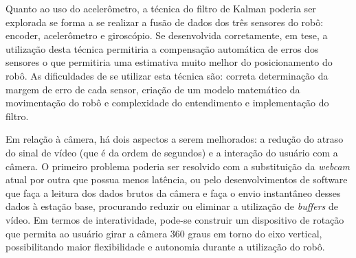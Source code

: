 Quanto ao uso do acelerômetro, a técnica do filtro de Kalman poderia ser explorada se forma a se realizar a fusão de dados dos três sensores do robô: encoder, acelerômetro e giroscópio. Se desenvolvida corretamente, em tese, a utilização desta técnica permitiria a compensação automática de erros dos sensores o que permitiria uma estimativa muito melhor do posicionamento do robô. As dificuldades de se utilizar esta técnica são: correta determinação da margem de erro de cada sensor, criação de um modelo matemático da movimentação do robô e complexidade do entendimento e implementação do filtro.

Em relação à câmera, há dois aspectos a serem melhorados: a redução do atraso do sinal de vídeo (que é da ordem de segundos) e a interação do usuário com a câmera. O primeiro problema poderia ser resolvido com a substituição da \textit{webcam} atual por outra que possua menos latência, ou pelo desenvolvimentos de software que faça a leitura dos dados brutos da câmera e faça o envio instantâneo desses dados à estação base, procurando reduzir ou eliminar a utilização de \textit{buffers} de vídeo. Em termos de interatividade, pode-se construir um dispositivo de rotação que permita ao usuário girar a câmera 360 graus em torno do eixo vertical, possibilitando maior flexibilidade e autonomia durante a utilização do robô.
